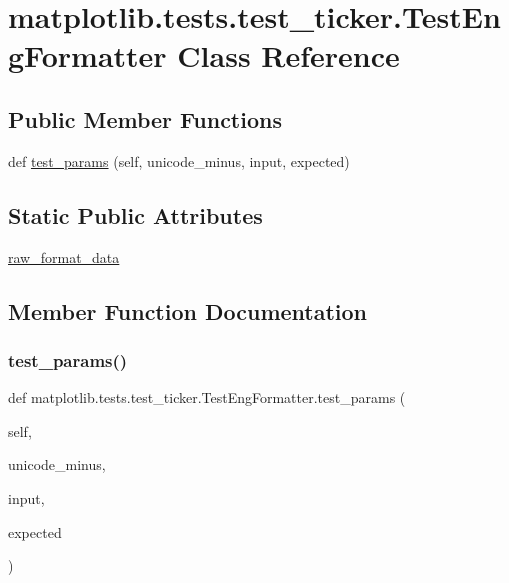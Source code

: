 \hypertarget{classmatplotlib_1_1tests_1_1test__ticker_1_1TestEngFormatter}{}\section{matplotlib.\+tests.\+test\+\_\+ticker.\+Test\+Eng\+Formatter Class Reference}
\label{classmatplotlib_1_1tests_1_1test__ticker_1_1TestEngFormatter}
\subsection*{Public Member Functions}
\begin{DoxyCompactItemize}
\item 
def \hyperlink{classmatplotlib_1_1tests_1_1test__ticker_1_1TestEngFormatter_a08dc61eea3137a40c1886dc82f4b99d4}{test\+\_\+params} (self, unicode\+\_\+minus, input, expected)
\end{DoxyCompactItemize}
\subsection*{Static Public Attributes}
\begin{DoxyCompactItemize}
\item 
\hyperlink{classmatplotlib_1_1tests_1_1test__ticker_1_1TestEngFormatter_ad6892bd4a75353f9e554e57125a30c67}{raw\+\_\+format\+\_\+data}
\end{DoxyCompactItemize}


\subsection{Member Function Documentation}
\mbox{\label{classmatplotlib_1_1tests_1_1test__ticker_1_1TestEngFormatter_a08dc61eea3137a40c1886dc82f4b99d4}} 
\subsubsection{\texorpdfstring{test\+\_\+params()}{test\_params()}}
{\footnotesize\ttfamily def matplotlib.\+tests.\+test\+\_\+ticker.\+Test\+Eng\+Formatter.\+test\+\_\+params (\begin{DoxyParamCaption}\item[{}]{self,  }\item[{}]{unicode\+\_\+minus,  }\item[{}]{input,  }\item[{}]{expected }\end{DoxyParamCaption})}


